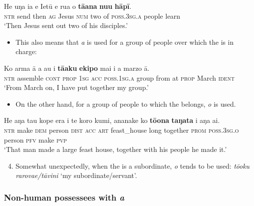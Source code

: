\ea\label{ex:6.66}
\gll He uŋa ia e Ietū e rua o \textbf{tā{\ꞌ}ana} \textbf{nu{\ꞌ}u} \textbf{hāpī}. \\
\textsc{ntr} send then \textsc{ag} Jesus \textsc{num} two of \textsc{poss.3sg.a} people learn \\

\glt
‘Then Jesus sent out two of his disciples.’ \textstyleExampleref{[Mrk. 14:13]}
\z

\begin{itemize}
\item[]
This also means that \textit{{\ꞌ}a} is used for a group of people over which the  is in charge: 
\end{itemize}

\ea\label{ex:6.67}
\gll Ko arma {\ꞌ}ā a au i \textbf{tā{\ꞌ}aku} \textbf{ekipo} mai i a marzo {\ꞌ}ā. \\
\textsc{ntr} assemble \textsc{cont} \textsc{prop} \textsc{1sg} \textsc{acc} \textsc{poss.1sg.a} group from at \textsc{prop} March \textsc{ident} \\

\glt
‘From March on, I have put together my group.’ \textstyleExampleref{[R625.082]} 
\z

\begin{itemize}
\item[]
On the other hand, for a group of people to which the  belongs, \textit{o} is used. 
\end{itemize}

\ea\label{ex:6.68}
\gll He aŋa tau kope era i te koro kumi, ananake ko \textbf{tō{\ꞌ}ona} \textbf{taŋata} i aŋa ai.\\
\textsc{ntr} make \textsc{dem} person \textsc{dist} \textsc{acc} \textsc{art} feast\_house long together \textsc{prom} \textsc{poss.3sg.o}  person \textsc{pfv} make \textsc{pvp}\\

\glt
‘That man made a large feast house, together with his people he made it.’ \textstyleExampleref{[Mtx-4-03.003]}
\z

\begin{enumerate}
\setcounter{enumi}{3}
\item 
Somewhat unexpectedly, when the  is a subordinate, \textit{o} tends to be used: \textit{tō{\ꞌ}oku rarova{\ꞌ}e/tāvini} ‘my subordinate/servant’.

\end{enumerate}
\subsubsection[Non{}-human possessees with {\ꞌ}a]{Non-human possessees with \textit{{\ꞌ}a}}\label{sec:6.3.3.2}

